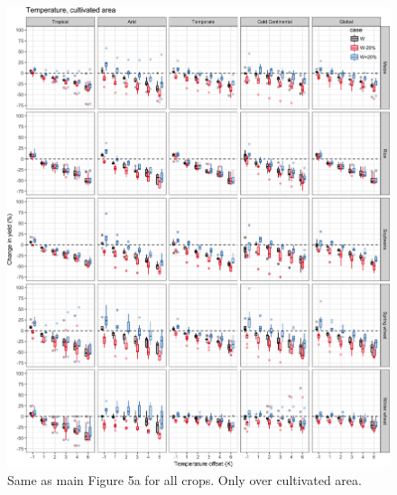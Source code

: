 \documentclass[10pt]{article}
\begin{document}
\begin{figure}[h!]
\centering
\includegraphics[width=\textwidth]{s_sim_CG_T_area.png}
\caption{Same as main Figure 5a for all crops. Only over cultivated area.}
\label{fig:temperautre}
\end{figure}
\end{document}
